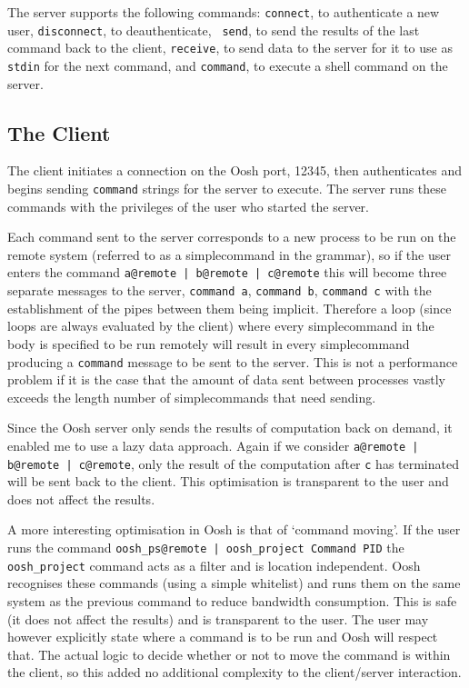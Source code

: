 \documentclass[12pt,twoside,notitlepage]{report}
\begin{document}
The server supports the following commands: {\tt connect}, to
authenticate a new user, {\tt disconnect}, to deauthenticate, {\tt
  send}, to send the results of the last command back to the client,
{\tt receive}, to send data to the server for it to use as {\tt stdin}
for the next command, and {\tt command}, to execute a shell command on
the server.

\subsection{The Client}
The client initiates a connection on the Oosh port, 12345, then
authenticates and begins sending {\tt command} strings for the server
to execute. The server runs these commands with the privileges of the
user who started the server.

Each command sent to the server corresponds to a new process to be run
on the remote system (referred to as a simplecommand in the grammar),
so if the user enters the command {\tt a@remote | b@remote | c@remote}
this will become three separate messages to the server, {\tt command
  a}, {\tt command b}, {\tt command c} with the establishment of the
pipes between them being implicit. Therefore a loop (since loops are
always evaluated by the client) where every simplecommand in the body
is specified to be run remotely will result in every simplecommand
producing a {\tt command} message to be sent to the server. This is
not a performance problem if it is the case that the amount of data
sent between processes vastly exceeds the length number of
simplecommands that need sending.

Since the Oosh server only sends the results of computation back on
demand, it enabled me to use a lazy data approach. Again if we
consider {\tt a@remote | b@remote | c@remote}, only the result of the
computation after {\tt c} has terminated will be sent back to the
client. This optimisation is transparent to the user and does not
affect the results.

A more interesting optimisation in Oosh is that of `command
moving'. If the user runs the command {\tt oosh\_ps@remote |
  oosh\_project Command PID} the {\tt oosh\_project} command acts as a
filter and is location independent. Oosh recognises these commands
(using a simple whitelist) and runs them on the same system as the
previous command to reduce bandwidth consumption. This is safe (it
does not affect the results) and is transparent to the user. The user
may however explicitly state where a command is to be run and Oosh
will respect that. The actual logic to decide whether or not to move
the command is within the client, so this added no additional
complexity to the client/server interaction.
\end{document}
